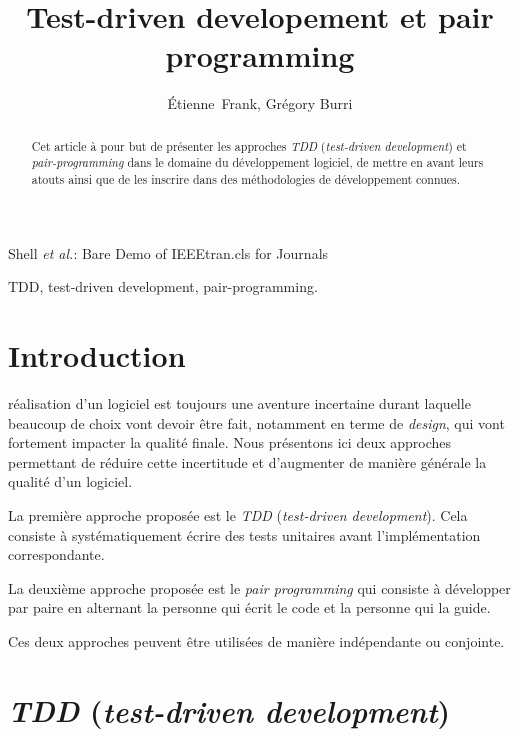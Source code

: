 \documentclass[journal, a4paper, frenchb]{IEEEtran}
\begin{document}
\title{Test-driven developement et pair programming}

\author{Étienne~Frank, Grégory Burri}

{Shell \MakeLowercase{\textit{et al.}}: Bare Demo of IEEEtran.cls for Journals}

\maketitle

\begin{abstract}
Cet article à pour but de présenter les approches \emph{TDD} (\emph{test-driven development}) et \emph{pair-programming} dans le domaine du développement logiciel, de mettre en avant leurs atouts ainsi que de les inscrire dans des méthodologies de développement connues.
\end{abstract}

\begin{IEEEkeywords}
TDD, test-driven development, pair-programming.
\end{IEEEkeywords}

\IEEEpeerreviewmaketitle

\section{Introduction}

 réalisation d'un logiciel est toujours une aventure incertaine durant laquelle beaucoup de choix vont devoir être fait, notamment en terme de \emph{design}, qui vont fortement impacter la qualité finale. Nous présentons ici deux approches permettant de réduire cette incertitude et d'augmenter de manière générale la qualité d'un logiciel.

La première approche proposée est le \emph{TDD} (\emph{test-driven development}). Cela consiste à systématiquement écrire des tests unitaires avant l'implémentation correspondante.

La deuxième approche proposée est le \emph{pair programming} qui consiste à développer par paire en alternant la personne qui écrit le code et la personne qui la guide.

Ces deux approches peuvent être utilisées de manière indépendante ou conjointe.


\section{\emph{TDD} (\emph{test-driven development})}
\end{document}
